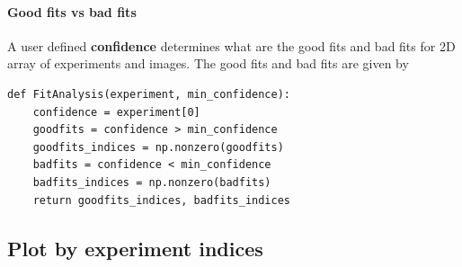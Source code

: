 \documentclass[12pt, twoside, a4paper]{article}
\begin{document}
\paragraph{Good fits vs bad fits}
A user defined \textbf{confidence} determines what are the good fits and bad fits for 2D array of experiments and images. The good fits and bad fits are given by
%
\begin{verbatim}
def FitAnalysis(experiment, min_confidence):
	confidence = experiment[0]
	goodfits = confidence > min_confidence
	goodfits_indices = np.nonzero(goodfits)
	badfits = confidence < min_confidence
	badfits_indices = np.nonzero(badfits)
	return goodfits_indices, badfits_indices
\end{verbatim}
%
\clearpage
\subsection{Plot by experiment indices}\label{sec: plot by experiment indices}
\end{document}
